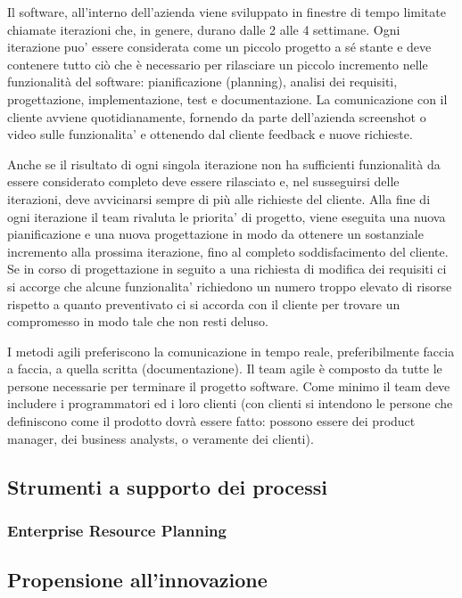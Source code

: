 Il software, all'interno dell'azienda viene sviluppato in finestre di tempo limitate chiamate iterazioni che, in genere, durano dalle 2 alle 4 settimane. Ogni iterazione puo' essere considerata come un piccolo progetto a sé stante e deve contenere tutto ciò che è necessario per rilasciare un piccolo incremento nelle funzionalità del software: pianificazione (planning), analisi dei requisiti, progettazione, implementazione, test e documentazione. La comunicazione con il cliente avviene quotidianamente, fornendo da parte dell'azienda screenshot o video sulle funzionalita' e ottenendo dal cliente feedback e nuove richieste.

Anche se il risultato di ogni singola iterazione non ha sufficienti funzionalità da essere considerato completo deve essere rilasciato e, nel susseguirsi delle iterazioni, deve avvicinarsi sempre di più alle richieste del cliente. Alla fine di ogni iterazione il team rivaluta le priorita' di progetto, viene eseguita una nuova pianificazione e una nuova progettazione in modo da ottenere un sostanziale incremento alla prossima iterazione, fino al completo soddisfacimento del cliente. Se in corso di progettazione in seguito a una richiesta di modifica dei requisiti ci si accorge che alcune funzionalita' richiedono un numero troppo elevato di risorse rispetto a quanto preventivato ci si accorda con il cliente per trovare un compromesso in modo tale che non resti deluso.

I metodi agili preferiscono la comunicazione in tempo reale, preferibilmente faccia a faccia, a quella scritta (documentazione). Il team agile è composto da tutte le persone necessarie per terminare il progetto software. Come minimo il team deve includere i programmatori ed i loro clienti (con clienti si intendono le persone che definiscono come il prodotto dovrà essere fatto: possono essere dei product manager, dei business analysts, o veramente dei clienti).

\subsection{Strumenti a supporto dei processi}
\subsubsection{Enterprise Resource Planning}

\subsection{Propensione all'innovazione}